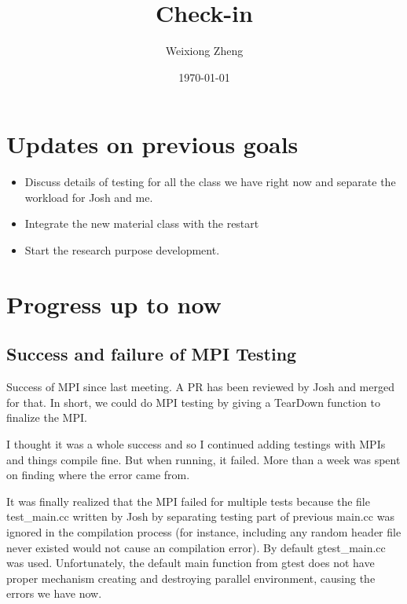 \documentclass{article}
\title{Check-in} %
\author{Weixiong Zheng} %
\date{\today} %
\begin{document}
\maketitle %

\section{Updates on previous goals}
\begin{itemize}
	\item Discuss details of testing for all the class we have right now and separate the workload for 
	Josh and me.
	\item Integrate the new material class with the restart
	\item Start the research purpose development.
\end{itemize}
\section{Progress up to now}
\subsection{Success and failure of MPI Testing}\label{debug}
Success of MPI since last meeting. A PR has been reviewed by Josh and merged for that.
In short, we could do MPI testing by giving a TearDown function to finalize the MPI.

I thought it was a whole success and so I continued adding testings with MPIs and things compile
fine. But when running, it failed. More than a week was spent on finding where the error
came from.

It was finally realized that the MPI failed for multiple tests because the file test\_main.cc
written by Josh by separating testing part of previous main.cc was ignored in the compilation
process (for instance, including any random header file never existed would not cause an 
compilation error).
By default
gtest\_main.cc was used. Unfortunately, the default main function from gtest
does not have proper mechanism creating and destroying parallel environment, causing
the errors we have now.
\end{document}
